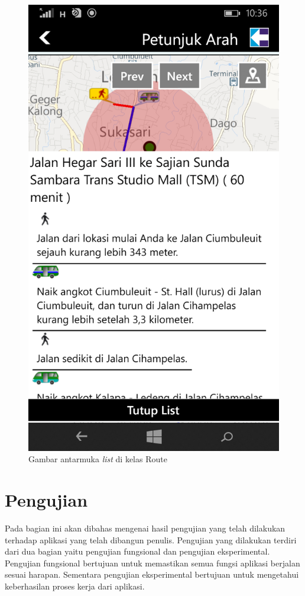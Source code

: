 	\begin{figure}[!h]
		\centering
			\includegraphics[scale=0.2]{Gambar/antarmuka/list_route}
		\caption{Gambar antarmuka \textit{list} di kelas Route}
		\label{fig:antarmuka list Route}
	\end{figure}

\newpage

\section{Pengujian}
\label{lab:Pengujian}
\hspace{0.5cm} Pada bagian ini akan dibahas mengenai hasil pengujian yang telah dilakukan terhadap aplikasi yang telah dibangun penulis. Pengujian yang dilakukan terdiri dari dua bagian yaitu pengujian fungsional dan pengujian eksperimental. Pengujian fungsional bertujuan untuk memastikan semua fungsi aplikasi berjalan sesuai harapan. Sementara pengujian eksperimental bertujuan untuk mengetahui keberhasilan proses kerja dari aplikasi.

